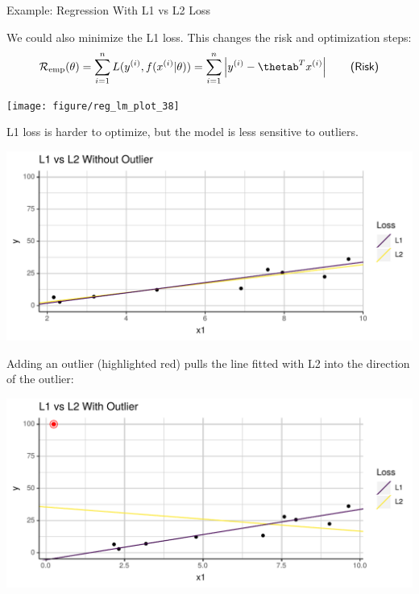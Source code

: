 \documentclass[11pt,compress,t,notes=noshow, xcolor=table]{beamer}
\newenvironment{knitrout}{}{} %
\begin{document}
\begin{vbframe}{Example: Regression With L1 vs L2 Loss}

We could also minimize the L1 loss. This changes the risk and optimization steps:
\[
\risket = \sumin \Lxyit = \sumin \left|\yi - \thetab^T \xi\right| \qquad \textsf{(Risk)}
\]

\begin{knitrout}\scriptsize
{}\color{fgcolor}

{\centering \texttt{[image: figure/reg\_lm\_plot\_38]}

}



\end{knitrout}

L1 loss is harder to optimize, but the model is less sensitive to outliers.

\framebreak

\lz
\lz

{\centering \includegraphics{figure_man/l2-vs-l1-1.pdf}}

\framebreak

Adding an outlier (highlighted red) pulls the line fitted with L2 into the direction of the outlier:

\lz

{\centering \includegraphics{figure_man/l2-vs-l1-2.pdf}}

\end{vbframe}
\end{document}
